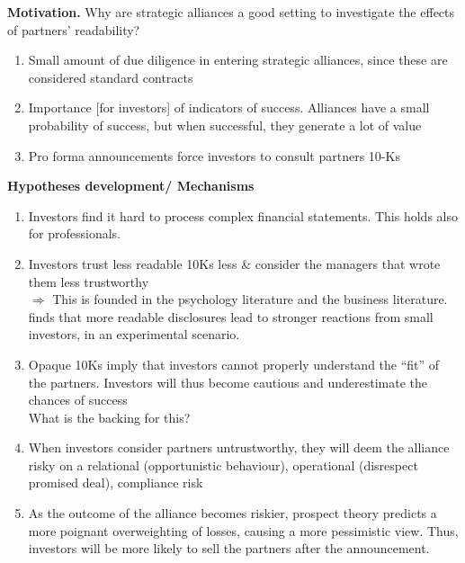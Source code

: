 \documentclass[11pt,a4paper,paranthesis]{article}
\begin{document}
\noindent \textbf{Motivation.} Why are strategic alliances a good setting to investigate the effects of partners' readability? 
\begin{enumerate} [leftmargin=*]
	\item Small amount of due diligence in entering strategic alliances, since these are considered standard contracts
	\item Importance [for investors] of indicators of success. Alliances have a small probability of success, but when successful, they generate a lot of value
	\item Pro forma announcements force investors to consult partners 10-Ks
\end{enumerate}

\noindent \textbf{Hypotheses development/ Mechanisms}
\begin{enumerate}[leftmargin=*]
	\item Investors find it hard to process complex financial statements. This holds also for professionals.
	\item Investors trust less readable 10Ks less \& consider the managers that wrote them less trustworthy \\
	$\Rightarrow$ This is founded in the psychology literature and the business literature. \cite{RENNEKAMP.2012} finds that more readable disclosures lead to stronger reactions from small investors, in an experimental scenario.
	\item Opaque 10Ks imply that investors cannot properly understand the ``fit'' of the partners. Investors will thus become cautious and underestimate the chances of success \\ {\color{red} What is the backing for this?}
	\item When investors consider partners untrustworthy, they will deem the alliance risky on a relational (opportunistic behaviour), operational (disrespect promised deal), compliance risk
	\item As the outcome of the alliance becomes riskier, prospect theory predicts a more poignant overweighting of losses, causing a more pessimistic view. Thus, investors will be more likely to sell the partners after the announcement.
\end{enumerate}


\end{document}

